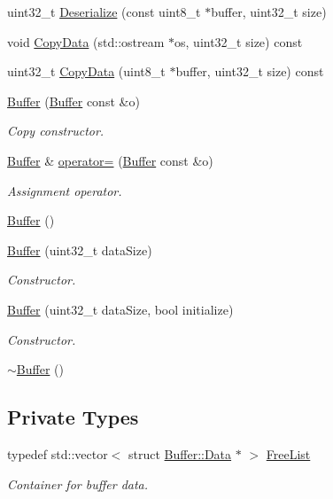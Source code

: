 \begin{DoxyCompactItemize}
uint32\+\_\+t \hyperlink{classns3_1_1Buffer_add89f12664174aa29c08264af66437ad}{Deserialize} (const uint8\+\_\+t $\ast$buffer, uint32\+\_\+t size)
\item 
void \hyperlink{classns3_1_1Buffer_aec4a3fd349f94e449b4b2d14dd964a4c}{Copy\+Data} (std\+::ostream $\ast$os, uint32\+\_\+t size) const 
\item 
uint32\+\_\+t \hyperlink{classns3_1_1Buffer_a06ddf3bd34aebc80f07e535bbc9ebcb2}{Copy\+Data} (uint8\+\_\+t $\ast$buffer, uint32\+\_\+t size) const 
\item 
\hyperlink{classns3_1_1Buffer_a2c97b3937de1161e3cdc40cef2cf00d6}{Buffer} (\hyperlink{classns3_1_1Buffer}{Buffer} const \&o)
\begin{DoxyCompactList}\small\item\em Copy constructor. \end{DoxyCompactList}\item 
\hyperlink{classns3_1_1Buffer}{Buffer} \& \hyperlink{classns3_1_1Buffer_a7c7cba562cba1633649786fdf78c5e6f}{operator=} (\hyperlink{classns3_1_1Buffer}{Buffer} const \&o)
\begin{DoxyCompactList}\small\item\em Assignment operator. \end{DoxyCompactList}\item 
\hyperlink{classns3_1_1Buffer_a287c877504ddcdbc244de0ca66227fda}{Buffer} ()
\item 
\hyperlink{classns3_1_1Buffer_a9688cd41afce38a174f394d3aabd09f6}{Buffer} (uint32\+\_\+t data\+Size)
\begin{DoxyCompactList}\small\item\em Constructor. \end{DoxyCompactList}\item 
\hyperlink{classns3_1_1Buffer_a0e958fc3813b98aa451cb60bdd646757}{Buffer} (uint32\+\_\+t data\+Size, bool initialize)
\begin{DoxyCompactList}\small\item\em Constructor. \end{DoxyCompactList}\item 
\hyperlink{classns3_1_1Buffer_a3672e1d34b98e7745a5eff5b89cdb920}{$\sim$\+Buffer} ()
\end{DoxyCompactItemize}
\subsection*{Private Types}
\begin{DoxyCompactItemize}
\item 
typedef std\+::vector$<$ struct \hyperlink{structns3_1_1Buffer_1_1Data}{Buffer\+::\+Data} $\ast$ $>$ \hyperlink{classns3_1_1Buffer_a5438e49e26e30d5a54940cf5118078fd}{Free\+List}
\begin{DoxyCompactList}\small\item\em Container for buffer data. \end{DoxyCompactList}\end{DoxyCompactItemize}
